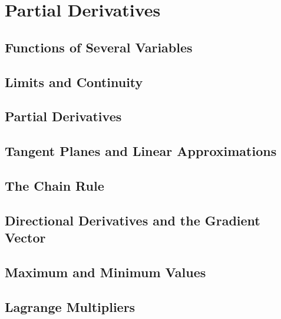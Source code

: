 \setcounter{chapter}{10}
\chapter{Partial Derivatives}
    \section{Functions of Several Variables}
    \section{Limits and Continuity}
    \section{Partial Derivatives}
    \section{Tangent Planes and Linear Approximations}
    \section{The Chain Rule}
    \section{Directional Derivatives and the Gradient Vector}
    \section{Maximum and Minimum Values}
    \section{Lagrange Multipliers}